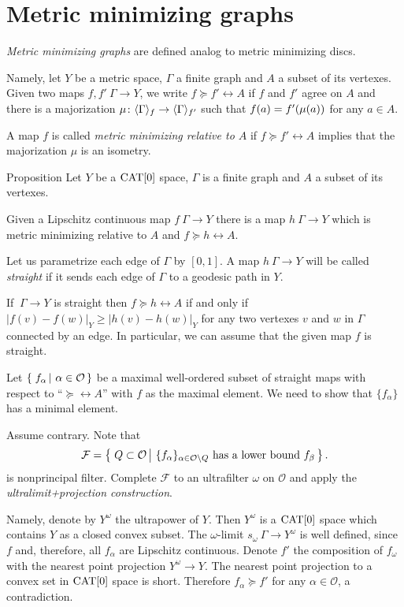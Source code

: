 \section{Metric minimizing graphs}\label{Metric minimizing graphs}

\emph{Metric minimizing graphs} are defined analog to metric minimizing discs.

Namely, let $Y$ be a metric space, $\Gamma$ a finite graph and $A$ a subset of its vertexes.
Given two maps $f,f'\:\Gamma\to Y$, we write $f\succcurlyeq f'\rel A$ if $f$ and $f'$ agree on $A$ 
and there is a majorization $\mu\colon\langle\Gamma\rangle_f\to \langle\Gamma\rangle_{f'}$
such that $f(a)\zz=f'(\mu(a))$ for any $a\in A$.

A map $f$ is called \emph{metric minimizing relative to $A$} if $f\succcurlyeq f'\rel A$ implies that the majorization $\mu$ is an isometry.

\begin{thm}{Proposition}\label{prop:metric-min-graph-exist}
Let $Y$ be a $\mathop{\rm CAT}\nolimits[0]$ space, 
$\Gamma$ is a finite graph and $A$ a subset of its vertexes.

Given a Lipschitz continuous map $f\:\Gamma\to Y$ there is a map $h\:\Gamma\to Y$ 
which is metric minimizing relative to $A$ and $f\succcurlyeq h\rel A$.
\end{thm}

Let us parametrize each edge of $\Gamma$ by $[0,1]$.
A map $h\:\Gamma\to Y$ will be called \emph{straight} if it
sends each edge of $\Gamma$ to a geodesic path in $Y$.

If $\:\Gamma\to Y$ is straight then $f\succcurlyeq h\rel A$ if and only if 
$|f(v)-f(w)|_Y\ge |h(v)-h(w)|_Y$
for any two vertexes $v$ and $w$ in $\Gamma$ connected by an edge.
In particular, we can assume that the given map $f$ is straight.

Let $\set{f_\alpha}{\alpha\in \mathcal{O}}$ be a maximal well-ordered subset of straight maps with respect to ``$\succcurlyeq\rel A$'' with $f$ as the maximal element. 
We need to show that $\{f_\alpha\}$ has a minimal element.

Assume contrary.
Note that
$$
\mathcal{F}
=
\set{Q\subset\mathcal{O}}{\{f_\alpha\}_{\alpha\in \mathcal{O}\backslash Q}\text{ has a lower bound } f_\beta}.
$$
is nonprincipal filter.
Complete $\mathcal{F}$ to an ultrafilter $\omega$ on $\mathcal{O}$ and apply the \emph{ultralimit+projection construction}.

Namely, denote by $Y^\omega$ the ultrapower of $Y$. 
Then $Y^\omega$
is a $\mathop{\rm CAT}\nolimits[0]$ space which contains $Y$ as a closed convex subset. 
The $\omega$-limit $s_\omega\:\Gamma\to Y^\omega$ is well defined, since
$f$ and, therefore, all $f_\alpha$ are Lipschitz continuous. 
Denote $f'$ the composition of $f_\omega$ with the nearest point projection $Y^\omega\to Y$.
The nearest point projection to a convex set in $\mathop{\rm CAT}\nolimits[0]$ space is short.
Therefore $f_\alpha\succcurlyeq f'$ for any $\alpha\in \mathcal{O}$, a contradiction.
\qeds


